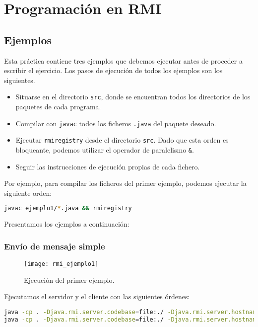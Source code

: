 \chapter{Programación en RMI}

\section{Ejemplos}

Esta práctica contiene tres ejemplos que debemos ejecutar antes de proceder a escribir el ejercicio.
Los pasos de ejecución de todos los ejemplos son los siguientes.

\begin{itemize}
	\item
		Situarse en el directorio \texttt{src}, donde se encuentran todos los directorios de los paquetes de cada programa.
	\item
		Compilar con \texttt{javac} todos los ficheros \texttt{.java} del paquete deseado.
	\item
		Ejecutar \texttt{rmiregistry} desde el directorio \texttt{src}.
		Dado que esta orden es bloqueante, podemos utilizar el operador de paralelismo \texttt{\&}.
	\item
		Seguir las instrucciones de ejecución propias de cada fichero.
\end{itemize}

Por ejemplo, para compilar los ficheros del primer ejemplo, podemos ejecutar la siguiente orden:

\begin{lstlisting}[language=sh]
javac ejemplo1/*.java && rmiregistry
\end{lstlisting}

Presentamos los ejemplos a continuación:

\subsection{Envío de mensaje simple}

\begin{figure}[!ht]
\begin{center}
	\texttt{[image: rmi\_ejemplo1]}
\end{center}
\caption{Ejecución del primer ejemplo.}
\end{figure}

\pagebreak

Ejecutamos el servidor y el cliente con las siguientes órdenes:

\begin{lstlisting}[language=sh]
java -cp . -Djava.rmi.server.codebase=file:./ -Djava.rmi.server.hostname=localhost      -Djava.security.policy=server.policy ejemplo1.Ejemplo
java -cp . -Djava.rmi.server.codebase=file:./ -Djava.rmi.server.hostname=localhost      -Djava.security.policy=server.policy ejemplo1.Cliente_Ejemplo localhost 1337
\end{lstlisting}

